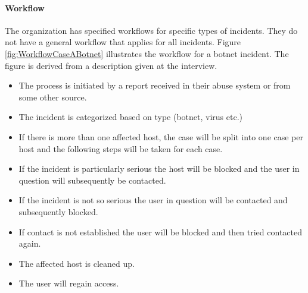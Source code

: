 \paragraph{Workflow}
The organization has specified workflows for specific types of incidents. They do not have a general workflow that applies for all incidents. Figure \ref{fig:WorkflowCaseABotnet} illustrates the workflow for a botnet incident. The figure is derived from a description given at the interview. 

\begin{itemize}\itemsep-0.2cm
\item The process is initiated by a report received in their abuse system or from some other source. 
\item The incident is categorized based on type (botnet, virus etc.)
\item If there is more than one affected host, the case will be split into one case per host and the following steps will be taken for each case.
\item If the incident is particularly serious the host will be blocked and the user in question will subsequently be contacted.
\item If the incident is not so serious the user in question will be contacted and subsequently blocked.
\item If contact is not established the user will be blocked and then tried contacted again.
\item The affected host is cleaned up.
\item The user will regain access.
\end{itemize}

